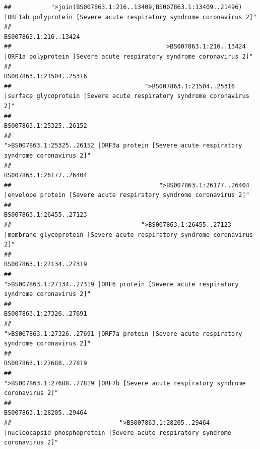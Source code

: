 \documentclass[
]{article}
\begin{document}
\begin{verbatim}
##           ">join(BS007863.1:216..13409,BS007863.1:13409..21496) |ORF1ab polyprotein [Severe acute respiratory syndrome coronavirus 2]" 
##                                                                                                                  BS007863.1:216..13424 
##                                          ">BS007863.1:216..13424 |ORF1a polyprotein [Severe acute respiratory syndrome coronavirus 2]" 
##                                                                                                                BS007863.1:21504..25316 
##                                     ">BS007863.1:21504..25316 |surface glycoprotein [Severe acute respiratory syndrome coronavirus 2]" 
##                                                                                                                BS007863.1:25325..26152 
##                                            ">BS007863.1:25325..26152 |ORF3a protein [Severe acute respiratory syndrome coronavirus 2]" 
##                                                                                                                BS007863.1:26177..26404 
##                                         ">BS007863.1:26177..26404 |envelope protein [Severe acute respiratory syndrome coronavirus 2]" 
##                                                                                                                BS007863.1:26455..27123 
##                                    ">BS007863.1:26455..27123 |membrane glycoprotein [Severe acute respiratory syndrome coronavirus 2]" 
##                                                                                                                BS007863.1:27134..27319 
##                                             ">BS007863.1:27134..27319 |ORF6 protein [Severe acute respiratory syndrome coronavirus 2]" 
##                                                                                                                BS007863.1:27326..27691 
##                                            ">BS007863.1:27326..27691 |ORF7a protein [Severe acute respiratory syndrome coronavirus 2]" 
##                                                                                                                BS007863.1:27688..27819 
##                                                    ">BS007863.1:27688..27819 |ORF7b [Severe acute respiratory syndrome coronavirus 2]" 
##                                                                                                                BS007863.1:28205..29464 
##                              ">BS007863.1:28205..29464 |nucleocapsid phosphoprotein [Severe acute respiratory syndrome coronavirus 2]" 

\end{verbatim}
\end{document}
